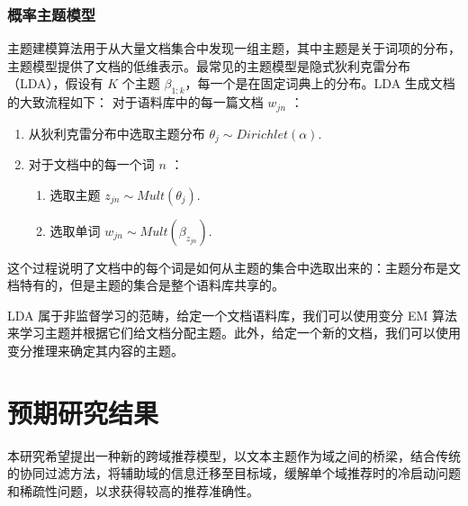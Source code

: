\subsubsection{概率主题模型} %
\label{sub:概率主题模型}
主题建模算法用于从大量文档集合中发现一组主题，其中主题是关于词项的分布，主题模型提供了文档的低维表示\cite{Chang2009Reading}。最常见的主题模型是隐式狄利克雷分布（LDA）\cite{Blei2003Latent}，假设有 $K$ 个主题 $\beta_{1:k}$，每一个是在固定词典上的分布。LDA 生成文档的大致流程如下：
对于语料库中的每一篇文档 $w_{jn}$ ：
\begin{enumerate}
\item 从狄利克雷分布中选取主题分布 $\theta_j \sim Dirichlet(\alpha).$
\item 对于文档中的每一个词 $n$ ：
	\begin{enumerate}
		\item 选取主题 $z_{jn} \sim Mult(\theta_j).$
		\item 选取单词 $w_{jn} \sim Mult(\beta_{z_{jn}}).$ 
	\end{enumerate}
\end{enumerate}
这个过程说明了文档中的每个词是如何从主题的集合中选取出来的：主题分布是文档特有的，但是主题的集合是整个语料库共享的。

LDA 属于非监督学习的范畴，给定一个文档语料库，我们可以使用变分 EM 算法来学习主题并根据它们给文档分配主题。此外，给定一个新的文档，我们可以使用变分推理来确定其内容的主题\cite{Blei2003Latent}。


\section{预期研究结果}
本研究希望提出一种新的跨域推荐模型，以文本主题作为域之间的桥梁，结合传统的协同过滤方法，将辅助域的信息迁移至目标域，缓解单个域推荐时的冷启动问题和稀疏性问题，以求获得较高的推荐准确性。

